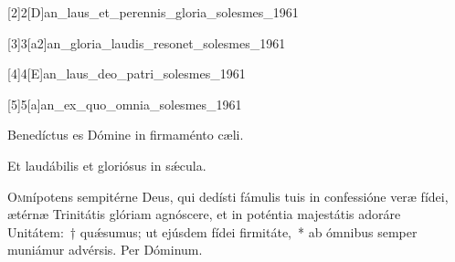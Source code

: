\documentclass[vesperale_romanum.tex]{subfiles}
\begin{document}
[2]{2}[D]{an_laus_et_perennis_gloria_solesmes_1961}

 \label{110_2}

 

[3]{3}[a2]{an_gloria_laudis_resonet_solesmes_1961}




[4]{4}[E]{an_laus_deo_patri_solesmes_1961}




[5]{5}[a]{an_ex_quo_omnia_solesmes_1961}




\hymnus



\vv Benedíctus es Dómine in firmaménto cæli.

\rr Et laudábilis et gloriósus in sǽcula.


\label{or_trinitatis} 

\oratio

\lettrine{O}{m}nípotens sempitérne Deus, qui dedísti fámulis tuis in confessióne veræ fídei, ætérnæ Trinitátis glóriam agnóscere, et in poténtia majestátis adoráre Unitátem:~† quǽsumus; ut ejúsdem fídei firmitáte,~* ab ómnibus semper muniámur advérsis. Per Dóminum.



\end{document}
